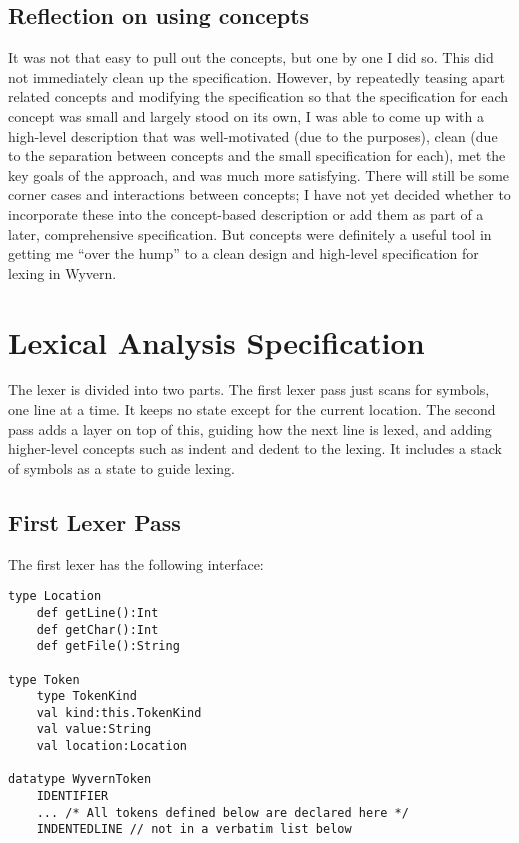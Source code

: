 \documentclass[11pt]{article}
\newcommand{\concept}[1]{
\noindent\vspace{2ex}
\begin{tabular}{p{0.8in}p{5.7in}}
\textbf{concept} & \textit{#1}\\
}
\begin{document}
\begin{sloppypar}
\subsection{Reflection on using concepts}

It was not that easy to pull out the concepts, but one by one I did so.  This did not immediately clean up the specification.  However, by repeatedly teasing apart related concepts and modifying the specification so that the specification for each concept was small and largely stood on its own, I was able to come up with a high-level description that was well-motivated (due to the purposes), clean (due to the separation between concepts and the small specification for each), met the key goals of the approach, and was much more satisfying.  There will still be some corner cases and interactions between concepts; I have not yet decided whether to incorporate these into the concept-based description or add them as part of a later, comprehensive specification.  But concepts were definitely a useful tool in getting me ``over the hump'' to a clean design and high-level specification for lexing in Wyvern.



\section{Lexical Analysis Specification}

The lexer is divided into two parts.  The first lexer pass just scans for symbols, one line at a time.  It keeps no state except for the current location.  The second pass adds a layer on top of this, guiding how the next line is lexed, and adding higher-level concepts such as indent and dedent to the lexing.  It includes a stack of symbols as a state to guide lexing.

\subsection{First Lexer Pass}

The first lexer has the following interface:

\begin{lstlisting}
type Location
    def getLine():Int
    def getChar():Int
    def getFile():String

type Token
    type TokenKind
    val kind:this.TokenKind
    val value:String
    val location:Location

datatype WyvernToken
    IDENTIFIER
    ... /* All tokens defined below are declared here */
    INDENTEDLINE // not in a verbatim list below


\end{lstlisting}
\end{sloppypar}
\end{document}
